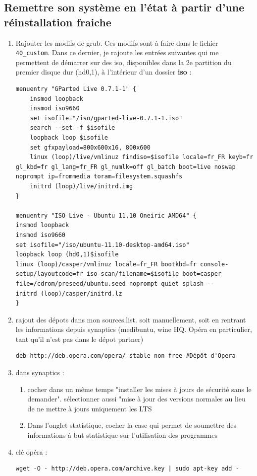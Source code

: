 \documentclass[a4paper,twoside]{article}
\begin{document}
\subsection{Remettre son système en l'état à partir d'une réinstallation fraiche}
\begin{enumerate}
\item Rajouter les modifs de grub. Ces modifs sont à faire dans le fichier \texttt{40\_custom}. Dans ce dernier, je rajoute les entrées suivantes qui me permettent de démarrer sur des iso, disponibles dans la 2e partition du premier disque dur (hd0,1), à l'intérieur d'un dossier \textbf{iso} :
\begin{verbatim}
menuentry "GParted Live 0.7.1-1" {
    insmod loopback
    insmod iso9660
    set isofile="/iso/gparted-live-0.7.1-1.iso"
    search --set -f $isofile
    loopback loop $isofile
    set gfxpayload=800x600x16, 800x600
    linux (loop)/live/vmlinuz findiso=$isofile locale=fr_FR keyb=fr gl_kbd=fr gl_lang=fr_FR gl_numlk=off gl_batch boot=live noswap noprompt ip=frommedia toram=filesystem.squashfs
    initrd (loop)/live/initrd.img
}

menuentry "ISO Live - Ubuntu 11.10 Oneiric AMD64" {
insmod loopback
insmod iso9660
set isofile="/iso/ubuntu-11.10-desktop-amd64.iso"
loopback loop (hd0,1)$isofile
linux (loop)/casper/vmlinuz locale=fr_FR bootkbd=fr console-setup/layoutcode=fr iso-scan/filename=$isofile boot=casper file=/cdrom/preseed/ubuntu.seed noprompt quiet splash --
initrd (loop)/casper/initrd.lz
}
\end{verbatim}

\item rajout des dépots dans mon sources.list. soit manuellement, soit en rentrant les informations depuis synaptics (medibuntu, wine HQ. Opéra en particulier, tant qu'il n'est pas dans le dépot partner)
\begin{verbatim}
deb http://deb.opera.com/opera/ stable non-free #Dépôt d'Opera
\end{verbatim}
\item dans synaptics :
\begin{enumerate}
\item cocher dans un même temps "installer les mises à jours de sécurité sans le demander". sélectionner aussi "mise à jour des versions normales au lieu de ne mettre à jours uniquement les LTS
\item Dans l'onglet statistique, cocher la case qui permet de soumettre des informations à but statistique sur l'utilisation des programmes
\end{enumerate}
\item clé opéra : 
\begin{verbatim}
wget -O - http://deb.opera.com/archive.key | sudo apt-key add -
\end{verbatim}


\end{enumerate}
\end{document}
